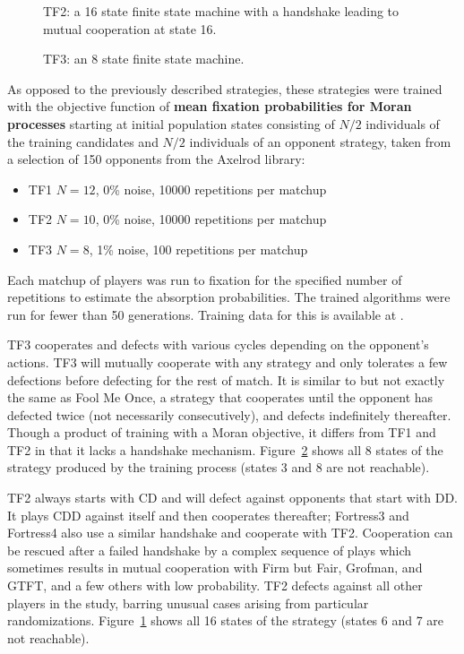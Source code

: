 \documentclass[10pt,journal]{IEEEtran}
\begin{document}
\begin{figure}[!hbtp]
    \centering
    \scalebox{.5}{}
    \caption{TF2: a 16 state finite state machine with a handshake leading to
    mutual cooperation at state 16.}
    \label{fig:tf2}
\end{figure}


\begin{figure}[!hbtp]
    \centering
    
    \caption{TF3: an 8 state finite state machine.}
    \label{fig:tf3}
\end{figure}

As opposed to the previously described strategies, these strategies were trained
with the objective function of \textbf{mean fixation probabilities for Moran
processes} starting at initial population states consisting of \(N/2\)
individuals of the training candidates and \(N/2\) individuals of an opponent
strategy, taken from a selection of 150 opponents from the Axelrod library:

\begin{itemize}
	\item TF1 \(N=12\), 0\% noise, 10000 repetitions per matchup
	\item TF2 \(N=10\), 0\% noise, 10000 repetitions per matchup
	\item TF3 \(N=8\), 1\% noise, 100 repetitions per matchup
\end{itemize}

Each matchup of players was run to fixation for the specified number of
repetitions to estimate the absorption probabilities. The trained algorithms
were run for fewer than 50 generations. Training data for this is available at
\cite{data}.

TF3 cooperates and defects with
various cycles depending on the opponent's actions. TF3 will mutually
cooperate with any strategy and only tolerates a few defections before
defecting for the rest of match. It is similar to but not exactly the same as
Fool Me Once, a strategy that cooperates until the opponent has defected twice
(not necessarily consecutively), and defects indefinitely thereafter. Though a
product of training with a Moran objective, it differs from TF1 and TF2
in that it lacks a handshake mechanism. Figure~\ref{fig:tf3} shows
all 8 states of the strategy produced by the training process (states 3 and 8
are not reachable).

TF2 always starts with CD and will defect against opponents that start with
DD\@. It plays CDD against itself and then cooperates thereafter; Fortress3 and
Fortress4 also use a similar handshake and cooperate with TF2. Cooperation
can be rescued after a failed handshake by a complex sequence of plays
which sometimes results in mutual cooperation with Firm but Fair, Grofman, and
GTFT, and a few others with low probability. TF2 defects against all other
players in the study, barring
unusual cases arising from particular randomizations. Figure~\ref{fig:tf2} shows
all 16 states of the strategy (states 6 and 7 are not reachable).
\end{document}
